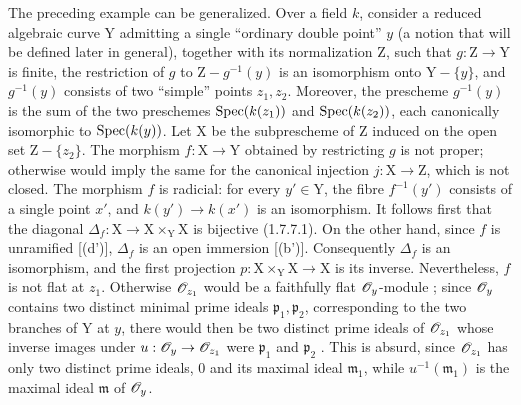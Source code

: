 \begin{env}[11.7.3]
\label{IV.11.7.3}
The preceding example can be generalized. Over a field $k$, consider a reduced algebraic curve $\mathrm{Y}$ admitting a single ``ordinary double point'' $y$ (a notion that will be defined later in general), together with its normalization $\mathrm{Z}$, such that $g:\mathrm{Z}\to\mathrm{Y}$ is finite, the restriction of $g$ to $\mathrm{Z}-g^{-1}(y)$ is an isomorphism onto $\mathrm{Y}-\{y\}$, and $g^{-1}(y)$ consists of two ``simple'' points $z_1,z_2$. Moreover, the prescheme $g^{-1}(y)$ is the sum of the two preschemes $\operatorname{Spec}(k(z_1))$ and $\operatorname{Spec}(k(z_2))$, each canonically isomorphic to $\operatorname{Spec}(k(y))$.
Let $\mathrm{X}$ be the subprescheme of $\mathrm{Z}$ induced on the open set $\mathrm{Z}-\{z_2\}$. The morphism $f:\mathrm{X}\to\mathrm{Y}$ obtained by restricting $g$ is not proper; otherwise  would imply the same for the canonical injection $j:\mathrm{X}\to\mathrm{Z}$, which is not closed.
The morphism $f$ is radicial: for every $y'\in\mathrm{Y}$, the fibre $f^{-1}(y')$ consists of a single point $x'$, and $k(y')\to k(x')$ is an isomorphism. It follows first that the diagonal $\Delta_f:\mathrm{X}\to\mathrm{X}\times_\mathrm{Y}\mathrm{X}$ is bijective (1.7.7.1). On the other hand, since $f$ is unramified [(d')], $\Delta_f$ is an open immersion [(b')]. Consequently $\Delta_f$ is an isomorphism, and the first projection $p:\mathrm{X}\times_\mathrm{Y}\mathrm{X}\to\mathrm{X}$ is its inverse.
Nevertheless, $f$ is not flat at $z_1$. Otherwise $\mathscr{O}_{z_1}$ would be a faithfully flat $\mathscr{O}_y$-module ; since $\mathscr{O}_y$ contains two distinct minimal prime ideals $\mathfrak{p}_1,\mathfrak{p}_2$, corresponding to the two branches of $\mathrm{Y}$ at $y$, there would then be two distinct prime ideals of $\mathscr{O}_{z_1}$ whose inverse images under $u:\mathscr{O}_y\to\mathscr{O}_{z_1}$ were $\mathfrak{p}_1$ and $\mathfrak{p}_2$ . This is absurd, since $\mathscr{O}_{z_1}$ has only two distinct prime ideals, $0$ and its maximal ideal $\mathfrak{m}_1$, while $u^{-1}(\mathfrak{m}_1)$ is the maximal ideal $\mathfrak{m}$ of $\mathscr{O}_y$.
\end{env}

